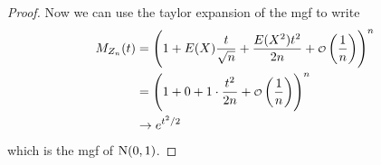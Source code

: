 \documentclass[12pt]{extarticle}
\newcommand{\Normal}{{\operatorfont N}}
\begin{document}
\begin{proof}
    Now we can use the taylor expansion of the mgf to write
    \begin{align}
        M_{Z_n}(t) & = \left(1+E(X) \frac{t}{\sqrt{n}} + \frac{E(X^2) t^2}{2n} + \o\left(\frac{1}{n}\right)\right)^n \\
                   & = \left(1 + 0 + 1 \cdot \frac{t^2}{2n} + \o\left(\frac{1}{n}\right)\right)^n                    \\
                   & \to e^{t^2 / 2}
    \end{align}
    which is the mgf of $\Normal(0, 1)$.
\end{proof}
\end{document}
